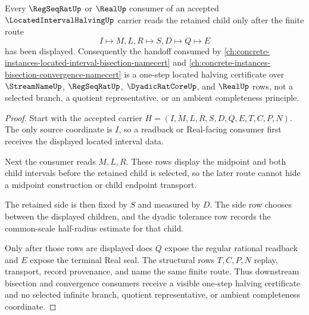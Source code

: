 \begin{theorem}
\label{thm:located-interval-halving-regseqrat-real-handoff}
Every $\RegSeqRatUp$ or $\RealUp$ consumer of an accepted $\LocatedIntervalHalvingUp$ carrier reads the retained child only after the finite route
$$
I \longmapsto M,L,R \longmapsto S,D \longmapsto Q \longmapsto E
$$
has been displayed. Consequently the handoff consumed by \autoref{ch:concrete-instances-located-interval-bisection-namecert} and \autoref{ch:concrete-instances-bisection-convergence-namecert} is a one-step located halving certificate over $\StreamNameUp$, $\RegSeqRatUp$, $\DyadicRatCoreUp$, and $\RealUp$ rows, not a selected branch, a quotient representative, or an ambient completeness principle.
\end{theorem}
\begin{proof}
Start with the accepted carrier $H=(I,M,L,R,S,D,Q,E,T,C,P,N)$. The only source coordinate is $I$, so a readback or Real-facing consumer first receives the displayed located interval data.

Next the consumer reads $M,L,R$. These rows display the midpoint and both child intervals before the retained child is selected, so the later route cannot hide a midpoint construction or child endpoint transport.

The retained side is then fixed by $S$ and measured by $D$. The side row chooses between the displayed children, and the dyadic tolerance row records the common-scale half-radius estimate for that child.

Only after those rows are displayed does $Q$ expose the regular rational readback and $E$ expose the terminal Real seal. The structural rows $T,C,P,N$ replay, transport, record provenance, and name the same finite route. Thus downstream bisection and convergence consumers receive a visible one-step halving certificate and no selected infinite branch, quotient representative, or ambient completeness coordinate.
\end{proof}


